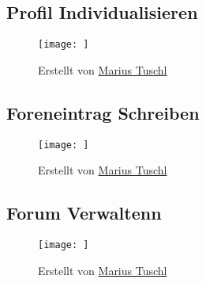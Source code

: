 \subsection*{Profil Individualisieren}
\begin{figure}[h!]
	\centering
	\texttt{[image: ]}
	\label{fig:ActDia_Profil_Individualisieren}
	\caption*{Erstellt von \hyperref[person:MariusTuschl]{Marius Tuschl}}
\end{figure}

\subsection*{Foreneintrag Schreiben}
\begin{figure}[h!]
	\centering
	\texttt{[image: ]}
	\label{fig:ActDia_Foreneinntrag_Schreiben}
	\caption*{Erstellt von \hyperref[person:MariusTuschl]{Marius Tuschl}}
\end{figure}

\subsection*{Forum Verwaltenn}
\begin{figure}[h!]
\centering
\texttt{[image: ]}
\label{fig:ActDia_Forum-Verwalten}
\caption*{Erstellt von \hyperref[person:MariusTuschl]{Marius Tuschl}}
\end{figure}